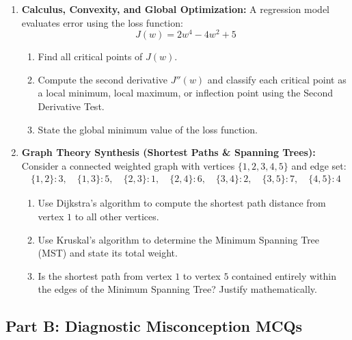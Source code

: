\begin{enumerate}
    \item \textbf{Calculus, Convexity, and Global Optimization:}
    A regression model evaluates error using the loss function:
    \begin{equation}
    J(w) = 2w^4 - 4w^2 + 5
    \end{equation}
    \begin{enumerate}
        \item Find all critical points of $J(w)$.
        \item Compute the second derivative $J''(w)$ and classify each critical point as a local minimum, local maximum, or inflection point using the Second Derivative Test.
        \item State the global minimum value of the loss function.
    \end{enumerate}

    \item \textbf{Graph Theory Synthesis (Shortest Paths \& Spanning Trees):}
    Consider a connected weighted graph with vertices $\{1, 2, 3, 4, 5\}$ and edge set:
    \begin{align*}
    \{1, 2\}: 3, \quad \{1, 3\}: 5, \quad \{2, 3\}: 1, \quad \{2, 4\}: 6, \quad \{3, 4\}: 2, \quad \{3, 5\}: 7, \quad \{4, 5\}: 4
    \end{align*}
    \begin{enumerate}
        \item Use Dijkstra's algorithm to compute the shortest path distance from vertex $1$ to all other vertices.
        \item Use Kruskal's algorithm to determine the Minimum Spanning Tree (MST) and state its total weight.
        \item Is the shortest path from vertex $1$ to vertex $5$ contained entirely within the edges of the Minimum Spanning Tree? Justify mathematically.
    \end{enumerate}
\end{enumerate}

\subsection*{Part B: Diagnostic Misconception MCQs}

